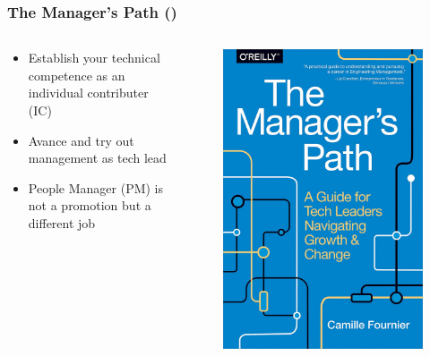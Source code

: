 \documentclass[aspectratio=169,xcolor=x11names,table]{beamer}
\begin{document}
\begin{frame}
	\frametitle{The Manager's Path (\cite{fournier2017manager})}
	\begin{columns}
		\begin{column}{0.7\linewidth}
			\begin{itemize}
				\item Establish your technical competence as an individual contributer (IC)
				\item Avance and try out management as tech lead
				\item People Manager (PM) is not a promotion but a different job
			\end{itemize}
		\end{column}
		\hfill
		\begin{column}{0.3\linewidth}
			\begin{figure}
				\centering
				\includegraphics[width=\columnwidth]{manager}
			\end{figure}
		\end{column}
	\end{columns}
\end{frame}
\end{document}
